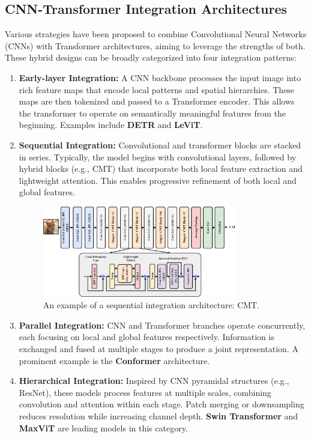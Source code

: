 \subsection{CNN-Transformer Integration Architectures}

Various strategies have been proposed to combine Convolutional Neural Networks (CNNs) with Transformer architectures, aiming to leverage the strengths of both. These hybrid designs can be broadly categorized into four integration patterns:

\begin{enumerate}
    \item \textbf{Early-layer Integration:} A CNN backbone processes the input image into rich feature maps that encode local patterns and spatial hierarchies. These maps are then tokenized and passed to a Transformer encoder. This allows the transformer to operate on semantically meaningful features from the beginning. Examples include \textbf{DETR} and \textbf{LeViT}.

    \item \textbf{Sequential Integration:} Convolutional and transformer blocks are stacked in series. Typically, the model begins with convolutional layers, followed by hybrid blocks (e.g., CMT) that incorporate both local feature extraction and lightweight attention. This enables progressive refinement of both local and global features.

    \begin{figure}[H]
        \centering
        \includegraphics[width=0.8\textwidth]{archivos/figuras/cmt.jpg}
        \caption{An example of a sequential integration architecture: CMT.}
        \label{fig:cmt_arch}
    \end{figure}

    \item \textbf{Parallel Integration:} CNN and Transformer branches operate concurrently, each focusing on local and global features respectively. Information is exchanged and fused at multiple stages to produce a joint representation. A prominent example is the \textbf{Conformer} architecture.

    \item \textbf{Hierarchical Integration:} Inspired by CNN pyramidal structures (e.g., ResNet), these models process features at multiple scales, combining convolution and attention within each stage. Patch merging or downsampling reduces resolution while increasing channel depth. \textbf{Swin Transformer} and \textbf{MaxViT} are leading models in this category.
\end{enumerate}

